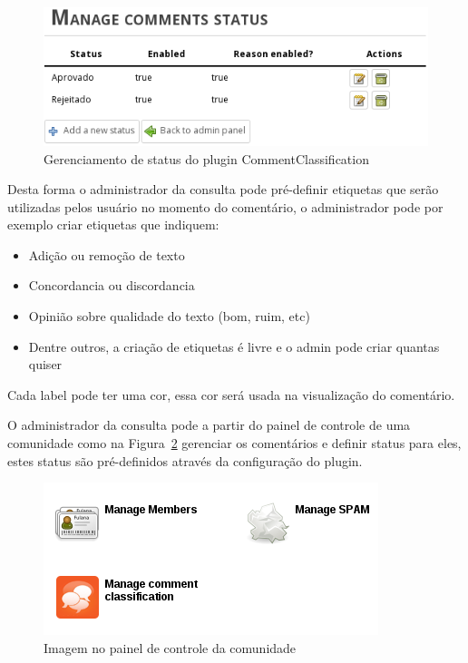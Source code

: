 \documentclass[12pt]{article}
\begin{document}
\begin{figure}[h]
\center
\includegraphics[scale=0.5]{manage-status.png}
\caption{Gerenciamento de status do plugin CommentClassification}
\label{manage-status}
\end{figure}

Desta forma o administrador da consulta pode pré-definir etiquetas que serão
utilizadas pelos usuário no momento do comentário, o administrador pode por
exemplo criar etiquetas que indiquem:

\begin{itemize}
  \item Adição ou remoção de texto
  \item Concordancia ou discordancia
  \item Opinião sobre qualidade do texto (bom, ruim, etc)
  \item Dentre outros, a criação de etiquetas é livre e o admin pode criar quantas quiser
\end{itemize}

Cada label pode ter uma cor, essa cor será usada na visualização do
comentário.

O administrador da consulta pode a partir do painel de controle de uma
comunidade como na Figura~\ref{control-panel} gerenciar os comentários e
definir status para eles, estes status são pré-definidos através da
configuração do plugin.

\begin{figure}[h]
\center
\includegraphics[scale=0.5]{control-panel.png}
\caption{Imagem no painel de controle da comunidade}
\label{control-panel}
\end{figure}
\end{document}

